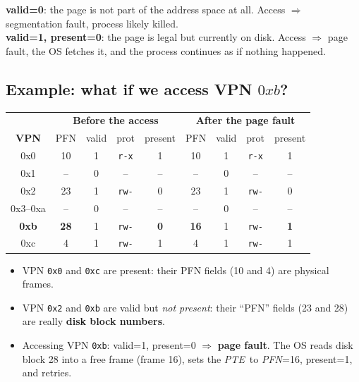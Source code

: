 \documentclass[11pt,a4paper]{article}
\newcommand{\pfn}{\textit{PFN}}
\newcommand{\pte}{\textit{PTE}}
\begin{document}
\begin{warnbox}
\textbf{valid=0}: the page is not part of the address space at all. Access
$\Rightarrow$ segmentation fault, process likely killed.\\
\textbf{valid=1, present=0}: the page is legal but currently on disk.
Access $\Rightarrow$ page fault, the OS fetches it, and the process
continues as if nothing happened.
\end{warnbox}

\subsection{Example: what if we access VPN \texorpdfstring{$0xb$}{0xb}?}

\begin{center}
\renewcommand{\arraystretch}{1.08}
\begin{tabular}{@{}c|cccc|cccc@{}}
  \toprule
  & \multicolumn{4}{c|}{\textbf{Before the access}} &
    \multicolumn{4}{c}{\textbf{After the page fault}} \\
  \textbf{VPN} & PFN & valid & prot & present & PFN & valid & prot & present \\
  \midrule
  0x0 & 10 & 1 & \texttt{r-x} & 1 & 10 & 1 & \texttt{r-x} & 1 \\
  0x1 & -- & 0 & --           & -- & -- & 0 & -- & -- \\
  0x2 & 23 & 1 & \texttt{rw-} & 0 & 23 & 1 & \texttt{rw-} & 0 \\
  0x3--0xa & -- & 0 & -- & -- & -- & 0 & -- & -- \\
  \textbf{0xb} & \textbf{28} & 1 & \texttt{rw-} & \textbf{0}
               & \textbf{16} & 1 & \texttt{rw-} & \textbf{1} \\
  0xc & 4  & 1 & \texttt{rw-} & 1 & 4  & 1 & \texttt{rw-} & 1 \\
  \bottomrule
\end{tabular}
\end{center}

\begin{itemize}
  \item VPN \texttt{0x0} and \texttt{0xc} are present: their PFN fields
        (10 and 4) are physical frames.
  \item VPN \texttt{0x2} and \texttt{0xb} are valid but \emph{not present}:
        their ``PFN'' fields (23 and 28) are really \textbf{disk block
        numbers}.
  \item Accessing VPN \texttt{0xb}: valid=1, present=0 $\Rightarrow$
        \textbf{page fault}. The OS reads disk block 28 into a free frame
        (frame 16), sets the \pte\ to \pfn=16, present=1, and retries.
\end{itemize}
\end{document}
